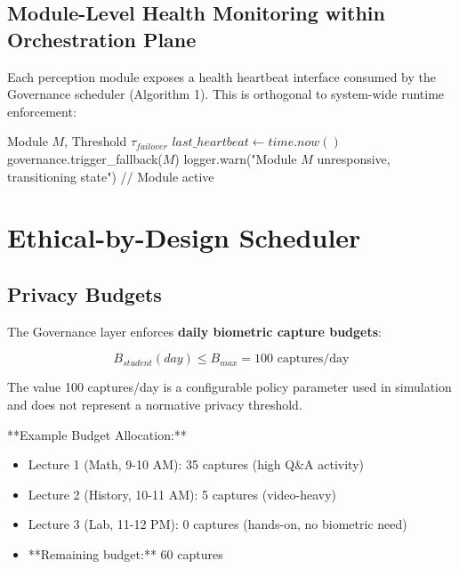 \documentclass[conference]{IEEEtran}
\begin{document}
\subsection{Module-Level Health Monitoring within Orchestration Plane}
Each perception module exposes a health heartbeat interface consumed by the Governance scheduler (Algorithm 1). This is orthogonal to system-wide runtime enforcement:

\begin{algorithm}[H]
\caption{Module Health Interface}
\begin{algorithmic}[1]
\REQUIRE Module $M$, Threshold $\tau_{failover}$
\STATE $last\_heartbeat \leftarrow time.now()$
\STATE governance.trigger\_fallback($M$)
\STATE logger.warn("Module $M$ unresponsive, transitioning state")
\ELSE
\STATE // Module active
\ENDIF
\ENDWHILE
\end{algorithmic}
\label{alg:watchdog}
\end{algorithm}

\section{Ethical-by-Design Scheduler}

\subsection{Privacy Budgets}
The Governance layer enforces \textbf{daily biometric capture budgets}:

\begin{equation}
B_{student}(day) \leq B_{max} = 100 \text{ captures/day}
\end{equation}

The value 100 captures/day is a configurable policy parameter used in simulation and does not represent a normative privacy threshold.

**Example Budget Allocation:**
\begin{itemize}
    \item Lecture 1 (Math, 9-10 AM): 35 captures (high Q\&A activity)
    \item Lecture 2 (History, 10-11 AM): 5 captures (video-heavy)
    \item Lecture 3 (Lab, 11-12 PM): 0 captures (hands-on, no biometric need)
    \item **Remaining budget:** 60 captures
\end{itemize}
\end{document}
